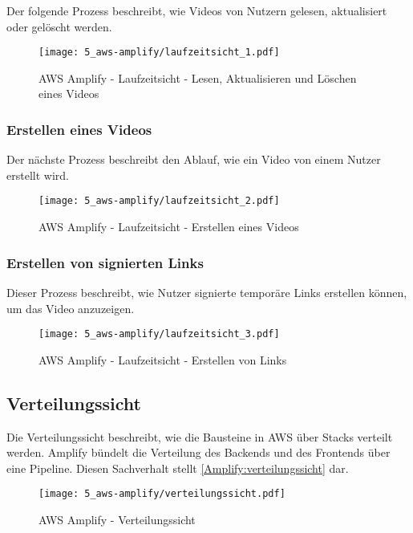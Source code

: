 Der folgende Prozess beschreibt, wie Videos von Nutzern gelesen, aktualisiert oder gelöscht werden.

\begin{figure}
  \centering
  \texttt{[image: 5\_aws-amplify/laufzeitsicht\_1.pdf]}
  \caption{AWS Amplify - Laufzeitsicht - Lesen, Aktualisieren und Löschen eines Videos}
  \label{Amplify:laufzeitsicht1}
\end{figure}

\subsubsection{Erstellen eines Videos}

Der nächste Prozess beschreibt den Ablauf, wie ein Video von einem Nutzer erstellt wird.

\begin{figure}
  \centering
  \texttt{[image: 5\_aws-amplify/laufzeitsicht\_2.pdf]}
  \caption{AWS Amplify - Laufzeitsicht - Erstellen eines Videos}
  \label{Amplify:laufzeitsicht2}
\end{figure}

\subsubsection{Erstellen von signierten Links}

Dieser Prozess beschreibt, wie Nutzer signierte temporäre Links erstellen können, um das Video anzuzeigen.

\begin{figure}
  \centering
  \texttt{[image: 5\_aws-amplify/laufzeitsicht\_3.pdf]}
  \caption{AWS Amplify - Laufzeitsicht - Erstellen von Links}
  \label{Amplify:laufzeitsicht3}
\end{figure}

\subsection{Verteilungssicht}

Die Verteilungssicht beschreibt, wie die Bausteine in \ac{AWS} über Stacks verteilt werden. Amplify bündelt die Verteilung des Backends und des Frontends über eine Pipeline. Diesen Sachverhalt stellt \autoref{Amplify:verteilungssicht} dar.

\begin{figure}
  \centering
  \texttt{[image: 5\_aws-amplify/verteilungssicht.pdf]}
  \caption{AWS Amplify - Verteilungssicht}
  \label{Amplify:verteilungssicht}
\end{figure}

